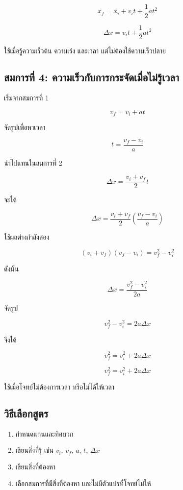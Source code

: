 \[
x_f=x_i+v_it+\frac{1}{2}at^2
\]

\begin{tcolorbox}[title=สมการที่ 3]
\[
\Delta x=v_it+\frac{1}{2}at^2
\]

ใช้เมื่อรู้ความเร็วต้น ความเร่ง และเวลา แต่ไม่ต้องใช้ความเร็วปลาย
\end{tcolorbox}

\subsection{สมการที่ 4: ความเร็วกับการกระจัดเมื่อไม่รู้เวลา}

เริ่มจากสมการที่ 1

\[
v_f=v_i+at
\]

จัดรูปเพื่อหาเวลา

\[
t=\frac{v_f-v_i}{a}
\]

นำไปแทนในสมการที่ 2

\[
\Delta x=\frac{v_i+v_f}{2}t
\]

จะได้

\[
\Delta x=\frac{v_i+v_f}{2}\left(\frac{v_f-v_i}{a}\right)
\]

ใช้ผลต่างกำลังสอง

\[
(v_i+v_f)(v_f-v_i)=v_f^2-v_i^2
\]

ดังนั้น

\[
\Delta x=\frac{v_f^2-v_i^2}{2a}
\]

จัดรูป

\[
v_f^2-v_i^2=2a\Delta x
\]

จึงได้

\[
v_f^2=v_i^2+2a\Delta x
\]

\begin{tcolorbox}[title=สมการที่ 4]
\[
v_f^2=v_i^2+2a\Delta x
\]

ใช้เมื่อโจทย์ไม่ต้องการเวลา หรือไม่ได้ให้เวลา
\end{tcolorbox}

\subsection{วิธีเลือกสูตร}

\begin{enumerate}
    \item กำหนดแกนและทิศบวก
    \item เขียนสิ่งที่รู้ เช่น $v_i$, $v_f$, $a$, $t$, $\Delta x$
    \item เขียนสิ่งที่ต้องหา
    \item เลือกสมการที่มีสิ่งที่ต้องหา และไม่มีตัวแปรที่โจทย์ไม่ให้
\end{enumerate}


